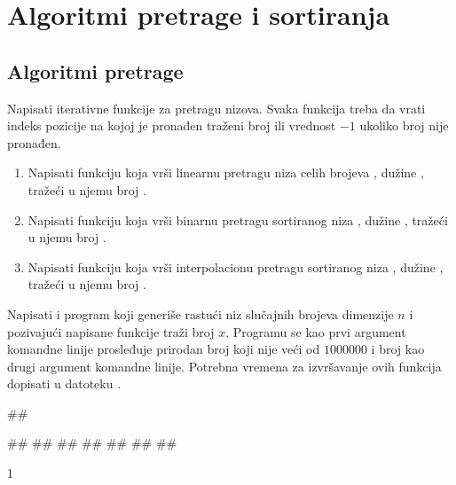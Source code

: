 
\chapter{Algoritmi pretrage i sortiranja}

\section{Algoritmi pretrage}

\begin{Exercise}[label=3_01]
  Napisati iterativne funkcije za pretragu nizova. Svaka funkcija treba
  da vrati indeks pozicije na kojoj je pronađen traženi broj ili
  vrednost $-1$ ukoliko broj nije pronađen.
  \begin{enumerate}  
  \item Napisati funkciju  koja vrši linearnu pretragu niza 
    celih brojeva , dužine , tražeći u njemu broj
    .  
  \item Napisati funkciju  koja vrši binarnu pretragu
    sortiranog niza , dužine , tražeći u njemu broj .
  \item Napisati funkciju  koja vrši interpolacionu pretragu
    sortiranog niza , dužine , tražeći u njemu broj .
  \end{enumerate}
  Napisati i program koji generiše rastući niz slučajnih brojeva dimenzije
  $n$ i pozivajući napisane funkcije traži broj $x$. Programu se kao prvi 
  argument komandne linije prosleđuje prirodan broj  koji nije veći od $1000000$ i broj  kao drugi
  argument komandne linije. Potrebna vremena za izvršavanje ovih
  funkcija dopisati u datoteku . 
\ifpdf \else \newpage \fi
  
\begin{miditest}
\begin{test}{1}
##
  
#\naslovIzlaz#
##
##
##
##
##
##
\end{test}
\end{miditest}
\begin{minitest}
\begin{test2}{1}
    


\end{test2}
\end{minitest}
\end{Exercise}
